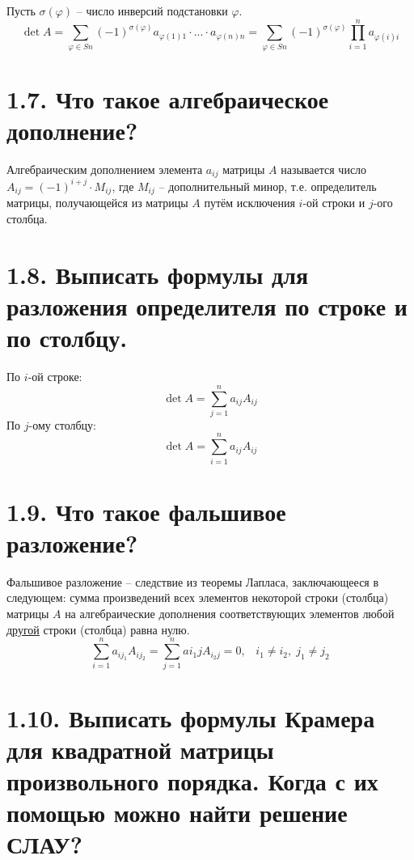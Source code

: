 \documentclass{article}
\begin{document}
Пусть $\sigma(\varphi)$ -- число инверсий подстановки $\varphi$.
$$
\det{A} = \sum_{\varphi \in Sn}(-1)^{\sigma(\varphi)}a_{\varphi(1)1}\cdot...\cdot a_{\varphi(n)n} = \sum_{\varphi \in Sn}(-1)^{\sigma(\varphi)} \prod_{i = 1}^n a_{\varphi(i)i}
$$

\section*{\LARGE 1.7. Что такое алгебраическое дополнение?  }

Алгебраическим дополнением элемента $a_{ij}$ матрицы $A$ называется число 
\newline $A_{ij} = (-1)^{i + j}\cdot M_{ij}$, где $M_{ij}$ -- дополнительный минор, т.е. определитель матрицы, получающейся из матрицы $A$ путём исключения $i$-ой строки и $j$-ого столбца.

\section*{\LARGE 1.8. Выписать формулы для разложения определителя по строке и по столбцу. }

По $i$-ой строке:
$$
\det{A} = \sum_{j = 1}^n a_{ij}A_{ij}
$$
По $j$-ому столбцу:
$$
\det{A} = \sum_{i = 1}^n a_{ij}A_{ij}
$$

\section*{\LARGE 1.9. Что такое фальшивое разложение?  }

Фальшивое разложение -- следствие из теоремы Лапласа, заключающееся в следующем: сумма произведений всех элементов некоторой строки (столбца) матрицы $A$ на алгебраические дополнения соответствующих элементов любой \underline{другой} строки (столбца) равна нулю.
$$
\sum_{i = 1}^n a_{ij_1}A_{ij_2} = \sum_{j = 1}^n a{i_1j}A_{i_2j} = 0, \;\;\;i_1 \ne i_2, \; j_1 \ne j_2
$$

\section*{\LARGE 1.10. Выписать формулы Крамера для квадратной матрицы произвольного порядка. Когда с их помощью можно найти решение СЛАУ?  }
\end{document}
